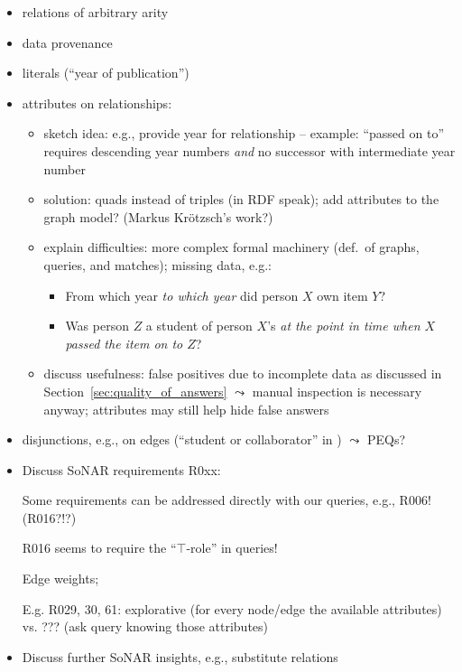 %
\begin{itemize}
  \item
    relations of arbitrary arity
  \item
    data provenance
  \item
    literals (\enquote{year of publication})
  \item
    attributes on relationships:
    \begin{itemize}
      \item
        sketch idea: e.g., provide year for relationship  -- example: \enquote{passed on to} requires descending year numbers \emph{and} no successor with intermediate year number
      \item
        solution: quads instead of triples (in \gls{RDF} speak); add attributes to the graph model? (Markus Krötzsch's work?)
      \item
        explain difficulties: more complex formal machinery (def.\ of graphs, queries, and matches); missing data, e.g.:
        \begin{itemize}
          \item
            From which year \emph{to which year} did person $X$ own item $Y$?
          \item
            Was person $Z$ a student of person $X$'s \emph{at the point in time when $X$ passed the item on to $Z$}?
        \end{itemize}
      \item
        discuss usefulness: false positives due to incomplete data as discussed in Section~\ref{sec:quality_of_answers}
        $\leadsto$ manual inspection is necessary anyway; attributes may still help hide false answers
    \end{itemize}
  \item
    disjunctions, e.g., on edges (\enquote{student or collaborator} in ) $\leadsto$ PEQs?
  \item
    Discuss \gls{SoNAR} requirements R0xx:
    
    Some requirements can be addressed directly with our queries, e.g., R006! (R016?!?)

    R016 seems to require the \enquote{$\top$-role} in queries!

    Edge weights;

    E.g. R029, 30, 61: explorative (for every node/edge the available attributes) vs. ??? (ask query knowing those attributes)
    
  \item
    Discuss further SoNAR insights, e.g., substitute relations
    
\end{itemize}
